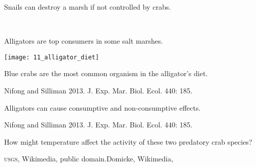 \documentclass[t]{beamer}
\begin{document}
%
{
\begin{frame}[b]{Snails can destroy a marsh if not controlled by crabs.}

	\hfill \tiny\textcolor{white}{Fig. 11.8 \textcopyright\,Sinauer Associates, Inc.}
\end{frame}
}
%
\begin{frame}[t]{Alligators are top consumers in some salt marshes.}

	\texttt{[image: 11\_alligator\_diet]}
	
	Blue crabs are the most common organism in the alligator's diet.

	\vfilll
	
	\hfill \tiny Nifong and Silliman 2013. J. Exp. Mar. Biol. Ecol. 440: 185.
\end{frame}
%
{
\begin{frame}[b]{Alligators can cause consumptive and non-consumptive effects.}

	\tiny Nifong and Silliman 2013. J. Exp. Mar. Biol. Ecol. 440: 185.
\end{frame}
}
%
{
\begin{frame}[b]{How might temperature affect the activity of these two predatory crab species?}


	\tiny \textsc{usgs}, Wikimedia, public domain.\hfill Domicke, Wikimedia, 
\end{frame}
}
%
\end{document}
